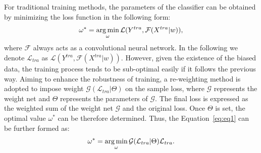 \documentclass[letterpaper]{article} %
\begin{document}
For traditional training methods, the parameters of the classifier can be obtained by minimizing the loss function in the following form:
\vspace{-0.1cm} 
\begin{equation}
    \omega^* = \mathop{\arg\min}_\omega \mathcal{L}(Y^{tra},\mathcal{F}(X^{tra}|w)),
    \label{eq:eq1}
\vspace{-0.15cm} 
\end{equation}
where $\mathcal{F}$ always acts as a convolutional neural network.
In the following we denote $\mathcal{L}_{tra}$ as $\mathcal{L}(Y^{tra},\mathcal{F}(X^{tra}|w))$.
However, given the existence of the biased data, the training process tends to be sub-optimal easily if it follows the previous way.
Aiming to enhance the robustness of training, a re-weighting method is adopted to impose weight $\mathcal{G}(\mathcal{L}_{tra}|\Theta)$ on the sample loss, where $\mathcal{G}$ represents the weight net and $\Theta$ represents the parameters of $\mathcal{G}$. 
The final loss is expressed as the weighted sum of the weight net $\mathcal{G}$ and the original loss.
Once $\Theta$ is set, the optimal value $\omega^*$ can be therefore determined.
Thus, the Equation~\ref{eq:eq1} can be further formed as:
\vspace{-0.1cm} 
\begin{equation}
    \omega^*  = \mathop{\arg\min}_\omega  \mathcal{G}(\mathcal{L}_{tra} |\Theta)\mathcal{L}_{tra}.
\vspace{-0.15cm} 
\end{equation}
\end{document}

